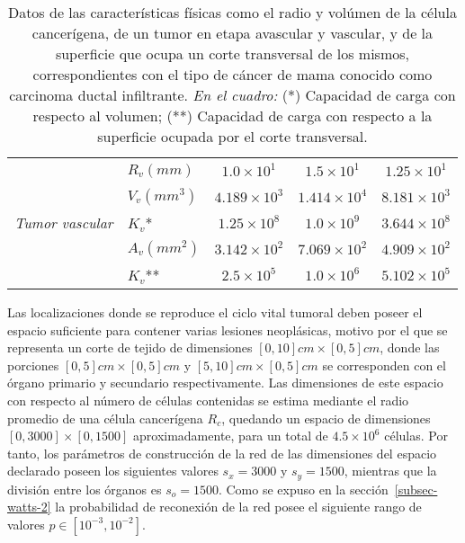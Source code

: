 \begin{table}[!ht]
\begin{center}
{\begin{tabular}{|c|c|c|c|c|}
    & \multicolumn{1}{|l|}{$R_v(mm)$} & \multicolumn{1}{|c|}{$1$.$0 \times 10^1$} & \multicolumn{1}{|c|}{$1$.$5 \times 10^1$} & \multicolumn{1}{|c|}{$1$.$25 \times 10^1$} \\\cline{2-5}
    & \multicolumn{1}{|l|}{$V_v(mm^3)$} & \multicolumn{1}{|c|}{$4$.$189 \times 10^3$} & \multicolumn{1}{|c|}{$1$.$414 \times 10^4$} & \multicolumn{1}{|c|}{$8$.$181 \times 10^3$} \\\cline{2-5} 
\emph{Tumor vascular} & \multicolumn{1}{|l|}{$K_v$*} & \multicolumn{1}{|c|}{$1$.$25 \times 10^8$} & \multicolumn{1}{|c|}{$1$.$0 \times 10^9$}& \multicolumn{1}{|c|}{$3$.$644 \times 10^8$} \\\cline{2-5} 
    & \multicolumn{1}{|l|}{$A_v(mm^2)$} & \multicolumn{1}{|c|}{$3$.$142 \times 10^2$} & \multicolumn{1}{|c|}{$7$.$069 \times 10^2$} & \multicolumn{1}{|c|}{$4$.$909 \times 10^2$}\\\cline{2-5} 
    & \multicolumn{1}{|l|}{$K_v$**} & \multicolumn{1}{|c|}{$2$.$5 \times 10^5$} & \multicolumn{1}{|c|}{$1$.$0 \times 10^6$} & \multicolumn{1}{|c|}{$5$.$102 \times 10^5$}\\\hline
\end{tabular}}\vspace*{-0.5cm}
\end{center}
\caption[Datos de las caracter\'isticas f\'isicas como el radio y vol\'umen de la c\'elula cancer\'igena, de un tumor en etapa avascular y vascular, y de la superficie que ocupa un corte transversal de los mismos]{Datos de las caracter\'isticas f\'isicas como el radio y vol\'umen de la c\'elula cancer\'igena, de un tumor en etapa avascular y vascular, y de la superficie que ocupa un corte transversal de los mismos, correspondientes con el tipo de c\'ancer de mama conocido como carcinoma ductal infiltrante. \emph{En el cuadro:} (*) Capacidad de carga con respecto al volumen; (**) Capacidad de carga con respecto a la superficie ocupada por el corte transversal.}
\label{table-original-values}
\end{table}
    
Las localizaciones donde se reproduce el ciclo vital tumoral deben poseer el espacio suficiente para contener varias lesiones neopl\'asicas, motivo por el que se representa un corte de tejido de dimensiones $[0,10]cm \times [0,5]cm$, donde las porciones $[0,5]cm \times [0,5]cm$ y $[5,10]cm \times [0,5]cm$ se corresponden con el \'organo primario y secundario respectivamente. Las dimensiones de este espacio con respecto al n\'umero de c\'elulas contenidas se estima mediante el radio promedio de una c\'elula cancer\'igena $R_c$, quedando un espacio de dimensiones $[0, 3000] \times [0, 1500]$ aproximadamente, para un total de $4$.$5 \times 10^6$ c\'elulas. Por tanto, los par\'ametros de construcci\'on de la red de las dimensiones del espacio declarado poseen los siguientes valores $s_x = 3000$ y $s_y = 1500$, mientras que la divisi\'on entre los \'organos es $s_o = 1500$. Como se expuso en la secci\'on~\ref{subsec-watts-2} la probabilidad de reconexi\'on de la red posee el siguiente rango de valores $p \in [10^{-3},10^{-2}]$.


